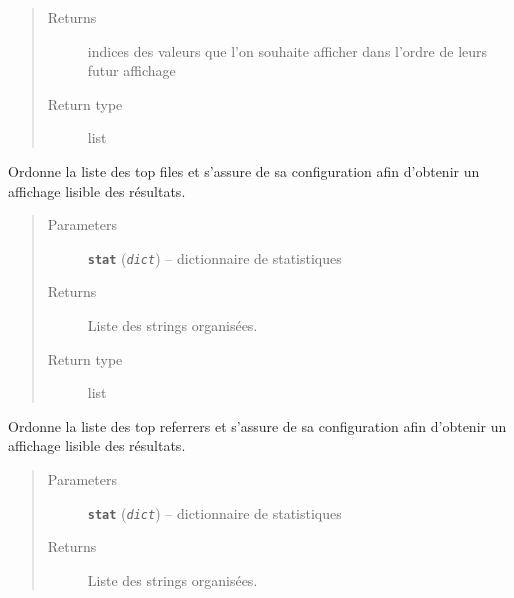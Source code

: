 \documentclass[letterpaper,10pt,english]{sphinxmanual}
\begin{document}
\begin{fulllineitems}
\begin{fulllineitems}
\begin{quote}
\begin{description}
\item[{Returns}] \leavevmode
indices des valeurs que l'on souhaite afficher dans l'ordre de leurs futur affichage

\item[{Return type}] \leavevmode
list

\end{description}\end{quote}

\end{fulllineitems}


\begin{fulllineitems}
\label{loganalyser:loganalyser.diagnostique.Diagnostique.get_topfiles}
Ordonne la liste des top files et s'assure de sa configuration afin d'obtenir un affichage lisible des
résultats.
\begin{quote}\begin{description}
\item[{Parameters}] \leavevmode
\textbf{\texttt{stat}} (\emph{\texttt{dict}}) -- dictionnaire de statistiques

\item[{Returns}] \leavevmode
Liste des strings organisées.

\item[{Return type}] \leavevmode
list

\end{description}\end{quote}

\end{fulllineitems}


\begin{fulllineitems}
\label{loganalyser:loganalyser.diagnostique.Diagnostique.get_topreferrers}
Ordonne la liste des top referrers et s'assure de sa configuration afin d'obtenir un affichage lisible des
résultats.
\begin{quote}\begin{description}
\item[{Parameters}] \leavevmode
\textbf{\texttt{stat}} (\emph{\texttt{dict}}) -- dictionnaire de statistiques

\item[{Returns}] \leavevmode
Liste des strings organisées.


\end{description}
\end{quote}
\end{fulllineitems}
\end{fulllineitems}
\end{document}
